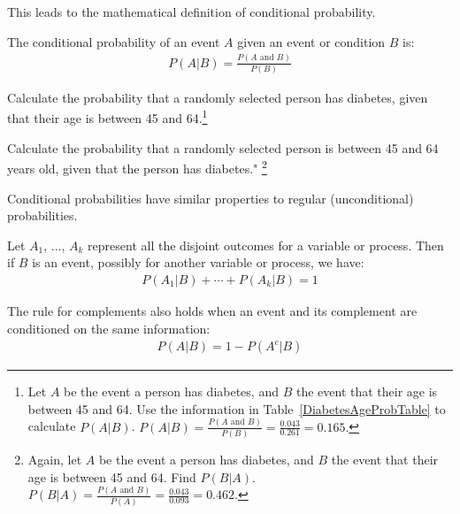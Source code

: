 This leads to the mathematical definition of conditional probability.

\begin{termBox}{
The conditional probability of an event $A$ given an event or condition $B$ is:
\begin{align}
P(A | B) = \frac{P(A\text{ and }B)}{P(B)}
\label{condProbEq}
\end{align}}
\end{termBox}

\begin{exercise}
Calculate the probability that a randomly selected person has diabetes, given that their age is between 45 and 64.\footnote{Let $A$ be the event a person has diabetes, and $B$ the event that their age is between 45 and 64. Use the information in Table~\ref{DiabetesAgeProbTable} to calculate $P(A|B)$. $P(A|B) = \frac{P(A\text{ and }B)}{P(B)} = \frac{0.043}{0.261} = 0.165.$}
\end{exercise}

\begin{exercise}
Calculate the probability that a randomly selected person is between 45 and 64 years old, given that the person has diabetes." \footnote{Again, let $A$ be the event a person has diabetes, and $B$ the event that their age is between 45 and 64. Find $P(B|A)$. $P(B|A) = \frac{P(A\text{ and }B)}{P(A)} = \frac{0.043}{0.093} = 0.462.$}	
\end{exercise}


Conditional probabilities have similar properties to regular (unconditional) probabilities.

\begin{termBox}{
Let $A_1$, ..., $A_k$ represent all the disjoint outcomes for a variable or process. Then if $B$ is an event, possibly for another variable or process, we have: \vspace{-1mm}
\begin{align*}
P(A_1|B)+\cdots+P(A_k|B) = 1
\end{align*}\vspace{-5.5mm} \par
The rule for complements also holds when an event and its complement are conditioned on the same information: \vspace{-1.5mm}
\begin{align*}
P(A | B) = 1 - P(A^c | B)
\end{align*}}
\end{termBox}

